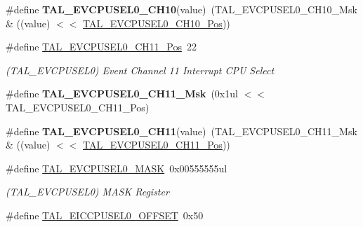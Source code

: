 \begin{DoxyCompactItemize}
\item 
\hypertarget{group___s_a_m_l21___t_a_l_gaf1c30fce6d036bf5f93eb94e7a3f640a}{}\#define {\bfseries T\+A\+L\+\_\+\+E\+V\+C\+P\+U\+S\+E\+L0\+\_\+\+C\+H10}(value)~(T\+A\+L\+\_\+\+E\+V\+C\+P\+U\+S\+E\+L0\+\_\+\+C\+H10\+\_\+\+Msk \& ((value) $<$$<$ \hyperlink{group___s_a_m_l21___t_a_l_gafe882dfb8dadefeb38ade0308c39e5f1}{T\+A\+L\+\_\+\+E\+V\+C\+P\+U\+S\+E\+L0\+\_\+\+C\+H10\+\_\+\+Pos}))\label{group___s_a_m_l21___t_a_l_gaf1c30fce6d036bf5f93eb94e7a3f640a}

\item 
\hypertarget{group___s_a_m_l21___t_a_l_gafadd86141100444de84f47e5baa20c07}{}\#define \hyperlink{group___s_a_m_l21___t_a_l_gafadd86141100444de84f47e5baa20c07}{T\+A\+L\+\_\+\+E\+V\+C\+P\+U\+S\+E\+L0\+\_\+\+C\+H11\+\_\+\+Pos}~22\label{group___s_a_m_l21___t_a_l_gafadd86141100444de84f47e5baa20c07}

\begin{DoxyCompactList}\small\item\em (T\+A\+L\+\_\+\+E\+V\+C\+P\+U\+S\+E\+L0) Event Channel 11 Interrupt C\+P\+U Select \end{DoxyCompactList}\item 
\hypertarget{group___s_a_m_l21___t_a_l_ga85f0acf61fae0dc8e684fbf7f7f42b08}{}\#define {\bfseries T\+A\+L\+\_\+\+E\+V\+C\+P\+U\+S\+E\+L0\+\_\+\+C\+H11\+\_\+\+Msk}~(0x1ul $<$$<$ T\+A\+L\+\_\+\+E\+V\+C\+P\+U\+S\+E\+L0\+\_\+\+C\+H11\+\_\+\+Pos)\label{group___s_a_m_l21___t_a_l_ga85f0acf61fae0dc8e684fbf7f7f42b08}

\item 
\hypertarget{group___s_a_m_l21___t_a_l_ga59e82fe88871e5a1ffd5ff06f4b6c7ee}{}\#define {\bfseries T\+A\+L\+\_\+\+E\+V\+C\+P\+U\+S\+E\+L0\+\_\+\+C\+H11}(value)~(T\+A\+L\+\_\+\+E\+V\+C\+P\+U\+S\+E\+L0\+\_\+\+C\+H11\+\_\+\+Msk \& ((value) $<$$<$ \hyperlink{group___s_a_m_l21___t_a_l_gafadd86141100444de84f47e5baa20c07}{T\+A\+L\+\_\+\+E\+V\+C\+P\+U\+S\+E\+L0\+\_\+\+C\+H11\+\_\+\+Pos}))\label{group___s_a_m_l21___t_a_l_ga59e82fe88871e5a1ffd5ff06f4b6c7ee}

\item 
\hypertarget{group___s_a_m_l21___t_a_l_ga19e4a7b41973eb3fd88a0a690b373c25}{}\#define \hyperlink{group___s_a_m_l21___t_a_l_ga19e4a7b41973eb3fd88a0a690b373c25}{T\+A\+L\+\_\+\+E\+V\+C\+P\+U\+S\+E\+L0\+\_\+\+M\+A\+S\+K}~0x00555555ul\label{group___s_a_m_l21___t_a_l_ga19e4a7b41973eb3fd88a0a690b373c25}

\begin{DoxyCompactList}\small\item\em (T\+A\+L\+\_\+\+E\+V\+C\+P\+U\+S\+E\+L0) M\+A\+S\+K Register \end{DoxyCompactList}\item 
\hypertarget{group___s_a_m_l21___t_a_l_ga3b1d86bf7eb80723aa21808086254d5e}{}\#define \hyperlink{group___s_a_m_l21___t_a_l_ga3b1d86bf7eb80723aa21808086254d5e}{T\+A\+L\+\_\+\+E\+I\+C\+C\+P\+U\+S\+E\+L0\+\_\+\+O\+F\+F\+S\+E\+T}~0x50\label{group___s_a_m_l21___t_a_l_ga3b1d86bf7eb80723aa21808086254d5e}


\end{DoxyCompactItemize}
